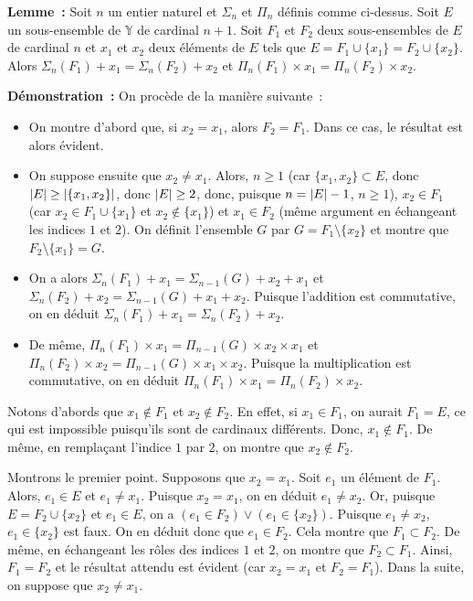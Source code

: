 \medskip

\noindent\textbf{Lemme :} Soit $n$ un entier naturel et $\Sigma_n$ et $\Pi_n$ définis comme ci-dessus. 
    Soit $E$ un sous-ensemble de $\mathbb{Y}$ de cardinal $n+1$. 
    Soit $F_1$ et $F_2$ deux sous-ensembles de $E$ de cardinal $n$ et $x_1$ et $x_2$ deux éléments de $E$ tels que $E = F_1 \cup \lbrace x_1 \rbrace = F_2 \cup \lbrace x_2 \rbrace$. 
    Alors $\Sigma_n (F_1) + x_1 = \Sigma_n (F_2) + x_2$ et $\Pi_n (F_1) \times x_1 = \Pi_n (F_2) \times x_2$.

\medskip

\noindent\textbf{Démonstration :}
    On procède de la manière suivante : 
    \begin{itemize}[nosep]
        \item On montre d'abord que, si $x_2 = x_1$, alors $F_2 = F_1$. 
            Dans ce cas, le résultat est alors évident. 
        \item On suppose ensuite que $x_2 \neq x_1$. 
            Alors, $n \geq 1$ (car $\lbrace x_1, x_2 \rbrace \subset E$, donc $\left\lvert E \right\rvert \geq \left\lvert \lbrace x_1, x_2 \rbrace \right\rvert$, donc $\left\lvert E \right\rvert \geq 2$, donc, puisque $n = \left\lvert E \right\rvert - 1$, $n \geq 1$), $x_2 \in F_1$ (car $x_2 \in F_1 \cup \lbrace x_1 \rbrace$ et $x_2 \notin \lbrace x_1 \rbrace$) et $x_1 \in F_2$ (même argument en échangeant les indices $1$ et $2$).
            On définit l'ensemble $G$ par $G = F_1 \setminus \lbrace x_2 \rbrace$ et montre que $F_2 \setminus \lbrace x_1 \rbrace = G$. 
        \item On a alors $\Sigma_n (F_1) + x_1 = \Sigma_{n-1} (G) + x_2 + x_1$ et $\Sigma_n (F_2) + x_2 = \Sigma_{n-1} (G) + x_1 + x_2$.
            Puisque l'addition est commutative, on en déduit $\Sigma_n (F_1) + x_1 = \Sigma_n (F_2) + x_2$.
        \item De même, $\Pi_n (F_1) \times x_1 = \Pi_{n-1} (G) \times x_2 \times x_1$ et $\Pi_n (F_2) \times x_2 = \Pi_{n-1} (G) \times x_1 \times x_2$.
            Puisque la multiplication est commutative, on en déduit $\Pi_n (F_1) \times x_1 = \Pi_n (F_2) \times x_2$.
    \end{itemize}

    Notons d'abords que $x_1 \notin F_1$ et $x_2 \notin F_2$. 
    En effet, si $x_1 \in F_1$, on aurait $F_1 = E$, ce qui est impossible puisqu'ils sont de cardinaux différents. 
    Donc, $x_1 \notin F_1$.
    De même, en remplaçant l'indice $1$ par $2$, on montre que $x_2 \notin F_2$.

    Montrons le premier point. 
    Supposons que $x_2 = x_1$. 
    Soit $e_1$ un élément de $F_1$. 
    Alors, $e_1 \in E$ et $e_1 \neq x_1$. 
    Puisque $x_2 = x_1$, on en déduit $e_1 \neq x_2$. 
    Or, puisque $E = F_2 \cup \lbrace x_2 \rbrace$ et $e_1 \in E$, on a $(e_1 \in F_2) \vee (e_1 \in \lbrace x_2 \rbrace)$. 
    Puisque $e_1 \neq x_2$, $e_1 \in \lbrace x_2 \rbrace$ est faux. 
    On en déduit donc que $e_1 \in F_2$.
    Cela montre que $F_1 \subset F_2$. 
    De même, en échangeant les rôles des indices $1$ et $2$, on montre que $F_2 \subset F_1$. 
    Ainsi, $F_1 = F_2$ et le résultat attendu est évident (car $x_2 = x_1$ et $F_2 = F_1$). 
    Dans la suite, on suppose que $x_2 \neq x_1$.

